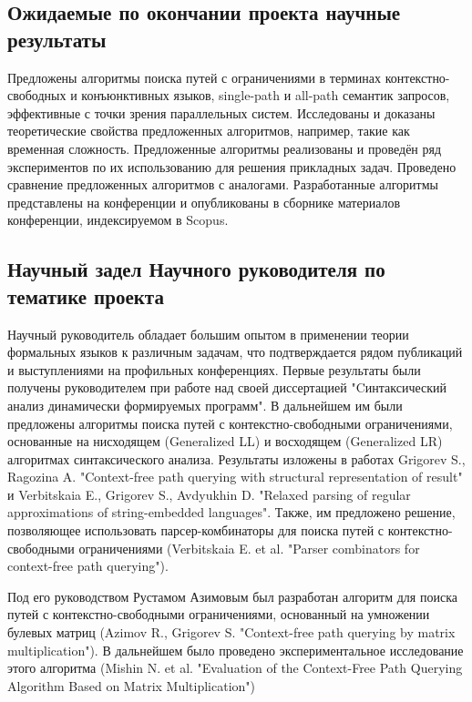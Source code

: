 \documentclass[12pt]{article}  %
\theoremstyle{remark}
\begin{document}
\subsection{Ожидаемые по окончании проекта научные результаты}
Предложены алгоритмы поиска путей с ограничениями в терминах контекстно-свободных и конъюнктивных языков, single-path и all-path семантик запросов, эффективные с точки зрения параллельных систем. Исследованы и доказаны теоретические свойства предложенных алгоритмов, например, такие как временная сложность. Предложенные алгоритмы реализованы и проведён ряд экспериментов по их использованию для решения прикладных задач. Проведено сравнение предложенных алгоритмов с аналогами. Разработанные алгоритмы представлены на конференции и опубликованы в сборнике материалов конференции, индексируемом в Scopus.

\subsection{Научный задел Научного руководителя по тематике проекта}
Научный руководитель обладает большим опытом в применении теории формальных языков к различным задачам, что подтверждается рядом публикаций и выступлениями на профильных конференциях.
Первые результаты были получены руководителем при работе над своей диссертацией "Cинтаксический анализ динамически формируемых программ". В дальнейшем им были предложены алгоритмы поиска путей с контекстно-свободными ограничениями, основанные на нисходящем (Generalized LL) и восходящем (Generalized LR) алгоритмах синтаксического анализа. Результаты изложены в работах Grigorev S., Ragozina A. "Context-free path querying with structural representation of result" и Verbitskaia E., Grigorev S., Avdyukhin D. "Relaxed parsing of regular approximations of string-embedded languages". Также, им предложено решение, позволяющее использовать парсер-комбинаторы для поиска путей с контекстно-свободными ограничениями (Verbitskaia E. et al. "Parser combinators for context-free path querying").

Под его руководством Рустамом Азимовым был разработан алгоритм для поиска путей с контекстно-свободными ограничениями, основанный на умножении булевых матриц (Azimov R., Grigorev S. "Context-free path querying by matrix multiplication"). В дальнейшем было проведено экспериментальное исследование этого алгоритма (Mishin N. et al. "Evaluation of the Context-Free Path Querying Algorithm Based on Matrix Multiplication")
\end{document}
